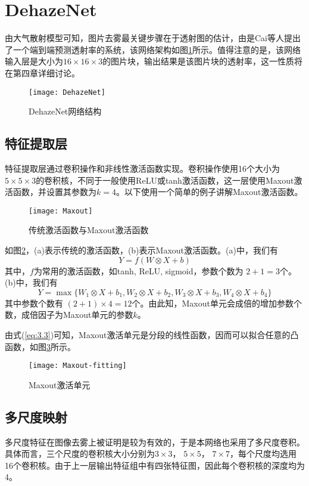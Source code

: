 \documentclass[a4paper, 12pt, oneside]{report}
\begin{document}
{\section{DehazeNet\quad}
由大气散射模型可知，图片去雾最关键步骤在于透射图的估计，由是Cai\cite{ref16}等人提出了一个端到端预测透射率的系统，该网络架构如图\ref{fig:3.4}所示。值得注意的是，该网络输入层是大小为$16 \times 16 \times 3$的图片块，输出结果是该图片块的透射率，这一性质将在第四章详细讨论。
\begin{figure}[h]
\centering
\texttt{[image: DehazeNet]}
\caption{DehazeNet网络结构}
\label{fig:3.4}
\end{figure}

\subsection{特征提取层\quad}
特征提取层通过卷积操作和非线性激活函数实现。卷积操作使用16个大小为$5 \times 5 \times 3$的卷积核，不同于一般使用ReLU或tanh激活函数，这一层使用Maxout\cite{ref19}激活函数，并设置其参数为$k = 4$。以下使用一个简单的例子讲解Maxout激活函数。
\begin{figure}[H]
\centering
\texttt{[image: Maxout]}
\caption{传统激活函数与Maxout激活函数}
\label{fig:3.5}
\end{figure}
如图\ref{fig:3.5}，(a)表示传统的激活函数，(b)表示Maxout激活函数。(a)中，我们有$$Y = f(W \otimes X + b)$$
其中，$f$为常用的激活函数，如tanh, ReLU, sigmoid，参数个数为 $2 + 1 = 3$个。(b)中，我们有
\begin{equation} \label{eq:3.3}
Y = \max\{W_1 \otimes X + b_1, W_2 \otimes X + b_2, W_3 \otimes X + b_3, W_4 \otimes X + b_4\}
\end{equation}
其中参数个数有 $(2 + 1) \times 4 = 12$个。由此知，Maxout单元会成倍的增加参数个数，成倍因子为Maxout单元的参数$k$。

由式(\ref{eq:3.3})可知，Maxout激活单元是分段的线性函数，因而可以拟合任意的凸函数，如图\ref{fig:3.6}所示。
\begin{figure}[H]
\centering
\texttt{[image: Maxout-fitting]}
\caption{Maxout激活单元}
\label{fig:3.6}
\end{figure}

\subsection{多尺度映射\quad}
多尺度特征在图像去雾上被证明是较为有效的，于是本网络也采用了多尺度卷积。具体而言，三个尺度的卷积核大小分别为$3\times 3$， $5\times 5$， $7\times 7$，每个尺度均选用16个卷积核。由于上一层输出特征组中有四张特征图，因此每个卷积核的深度均为4。

}
\end{document}
